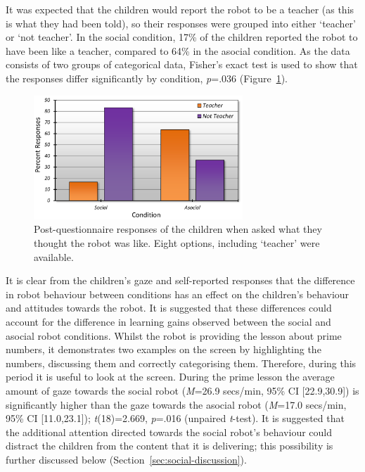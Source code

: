 It was expected that the children would report the robot to be a teacher (as this is what they had been told), so their responses were grouped into either `teacher' or `not teacher'. In the social condition, 17\% of the children reported the robot to have been like a teacher, compared to 64\% in the asocial condition. As the data consists of two groups of categorical data, Fisher's exact test is used to show that the responses differ significantly by condition, \textit{p}=.036 (Figure~\ref{fig:ch7_questionnaire}).

\begin{figure}[t!]
    \centering
    \includegraphics[width=0.7\textwidth]{images/ch7_quest_graph.pdf}
    \caption{Post-questionnaire responses of the children when asked what they thought the robot was like. Eight options, including `teacher' were available.}
    \label{fig:ch7_questionnaire}
\end{figure}

It is clear from the children's gaze and self-reported responses that the difference in robot behaviour between conditions has an effect on the children's behaviour and attitudes towards the robot. It is suggested that these differences could account for the difference in \gls{learning} gains observed between the social and asocial robot conditions. Whilst the robot is providing the lesson about prime numbers, it demonstrates two examples on the screen by highlighting the numbers, discussing them and correctly categorising them. Therefore, during this period it is useful to look at the screen. During the prime lesson the average amount of gaze towards the social robot (\textit{M}=26.9 secs/min, 95\% CI [22.9,30.9]) is significantly higher than the gaze towards the asocial robot (\textit{M}=17.0 secs/min, 95\% CI [11.0,23.1]); \textit{t}(18)=2.669, \textit{p}=.016 (unpaired \textit{t}-test). It is suggested that the additional attention directed towards the social robot's behaviour could distract the children from the content that it is delivering; this possibility is further discussed below (Section~\ref{sec:social-discussion}).

